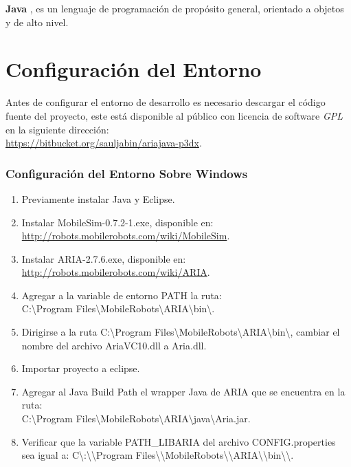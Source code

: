 \documentclass[11pt,twoside,A5]{article}
\newcommand{\sourcecode}[2][\footnotesize]{{\ttfamily#1#2}}
\newcommand{\link}[1]{{\footnotesize\url{#1}}}
\begin{document}
\textbf{Java} \cite{java2014}, es un lenguaje de programación de propósito general, orientado a objetos y de alto nivel. 
 
\section*{Configuración del Entorno}

Antes de configurar el entorno de desarrollo es necesario descargar el código fuente del proyecto,
este está disponible al público con licencia de software \textit{GPL} en la siguiente dirección:
\\ \link{https://bitbucket.org/sauljabin/ariajava-p3dx}.

\subsubsection*{Configuración del Entorno Sobre Windows}

\begin{enumerate}
\item Previamente instalar Java y Eclipse.
\item Instalar \sourcecode{MobileSim-0.7.2-1.exe}, disponible en: \\ \link{http://robots.mobilerobots.com/wiki/MobileSim}.
\item Instalar \sourcecode{ARIA-2.7.6.exe}, disponible en: \\ \link{http://robots.mobilerobots.com/wiki/ARIA}.
\item Agregar a la variable de entorno \sourcecode{PATH} la ruta: \\ \sourcecode{C:\textbackslash Program Files\textbackslash MobileRobots\textbackslash ARIA\textbackslash bin\textbackslash}.
\item Dirigirse a la ruta \sourcecode{C:\textbackslash Program Files\textbackslash MobileRobots\textbackslash ARIA\textbackslash bin\textbackslash}, cambiar el nombre del archivo
\sourcecode{AriaVC10.dll} a  \sourcecode{Aria.dll}.
\item Importar proyecto a eclipse.
\item Agregar al \sourcecode{Java Build Path} el wrapper Java de ARIA que se encuentra en la ruta: \\ \sourcecode{C:\textbackslash Program Files\textbackslash MobileRobots\textbackslash ARIA\textbackslash java\textbackslash Aria.jar}.
\item Verificar que la variable  \sourcecode{PATH\_LIBARIA} del archivo  \sourcecode{CONFIG.properties} 
	  sea igual a:  \sourcecode{C\textbackslash:\textbackslash\textbackslash Program Files\textbackslash\textbackslash MobileRobots\textbackslash\textbackslash ARIA\textbackslash\textbackslash bin\textbackslash\textbackslash }.
\end{enumerate}
\end{document}
